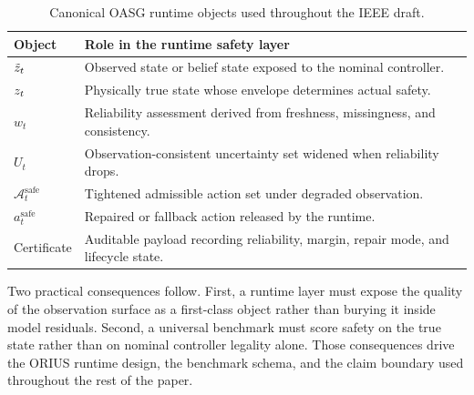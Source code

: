 \begin{table}[t]
\centering
\caption{Canonical OASG runtime objects used throughout the IEEE draft.}
\label{tab:ieee-oasg-objects}
\small
\begin{tabularx}{\columnwidth}{@{}p{}X@{}}
\toprule
\textbf{Object} & \textbf{Role in the runtime safety layer}\\
\midrule
$\tilde{z}_t$ & Observed state or belief state exposed to the nominal controller.\\
$z_t$ & Physically true state whose envelope determines actual safety.\\
$w_t$ & Reliability assessment derived from freshness, missingness, and consistency.\\
$U_t$ & Observation-consistent uncertainty set widened when reliability drops.\\
$\mathcal{A}_t^{\mathrm{safe}}$ & Tightened admissible action set under degraded observation.\\
$a_t^{\mathrm{safe}}$ & Repaired or fallback action released by the runtime.\\
Certificate & Auditable payload recording reliability, margin, repair mode, and lifecycle state.\\
\bottomrule
\end{tabularx}
\end{table}

Two practical consequences follow. First, a runtime layer must expose the quality of
the observation surface as a first-class object rather than burying it inside model
residuals. Second, a universal benchmark must score safety on the true state rather
than on nominal controller legality alone. Those consequences drive the ORIUS runtime
design, the benchmark schema, and the claim boundary used throughout the rest of the
paper.

